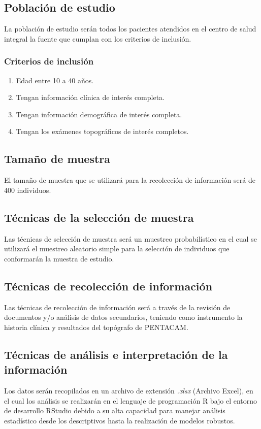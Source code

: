 \subsection{Población de estudio}
La población de estudio serán todos los pacientes atendidos en el centro de salud integral la fuente que cumplan con los criterios de inclusión.

\subsubsection{Criterios de inclusión}
\begin{enumerate}
    \item Edad entre 10 a 40 años.
    \item Tengan información clínica de interés completa.
    \item Tengan información demográfica de interés completa.
    \item Tengan los exámenes topográficos de interés completos. 
\end{enumerate}

\subsection{Tamaño de muestra}
El tamaño de muestra que se utilizará para la recolección de información será de 400 individuos.

\subsection{Técnicas de la selección de muestra}
Las técnicas de selección de muestra será un muestreo probabilístico en el cual se utilizará el muestreo aleatorio simple para la selección de individuos que conformarán la muestra de estudio.

\subsection{Técnicas de recolección de información}
Las técnicas de recolección de información será a través de la revisión de documentos y/o análisis de datos secundarios, teniendo como instrumento la historia clínica y resultados del topógrafo de PENTACAM.

\subsection{Técnicas de análisis e interpretación de la información}
Los datos serán recopilados en un archivo de extensión \textsl{.xlsx} (Archivo Excel), en el cual los análisis se realizarán en el lenguaje de programación R bajo el entorno de desarrollo RStudio debido a su alta capacidad para manejar análisis estadístico desde los descriptivos hasta la realización de modelos robustos.

